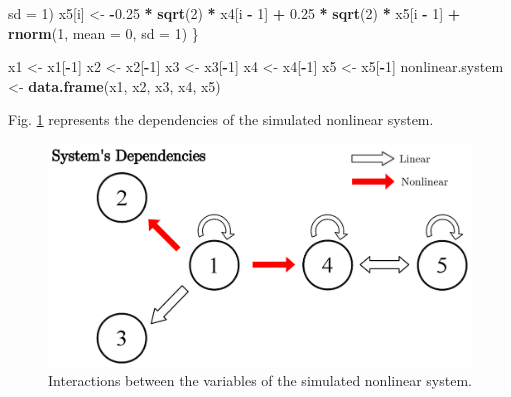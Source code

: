\documentclass[]{book}
\newenvironment{Shaded}{\begin{snugshade}}{\end{snugshade}}
\newcommand{\KeywordTok}[1]{\textcolor[rgb]{0.13,0.29,0.53}{\textbf{#1}}}
\newcommand{\DataTypeTok}[1]{\textcolor[rgb]{0.13,0.29,0.53}{#1}}
\newcommand{\DecValTok}[1]{\textcolor[rgb]{0.00,0.00,0.81}{#1}}
\newcommand{\FloatTok}[1]{\textcolor[rgb]{0.00,0.00,0.81}{#1}}
\newcommand{\StringTok}[1]{\textcolor[rgb]{0.31,0.60,0.02}{#1}}
\newcommand{\OperatorTok}[1]{\textcolor[rgb]{0.81,0.36,0.00}{\textbf{#1}}}
\newcommand{\NormalTok}[1]{#1}
\theoremstyle{definition}
\theoremstyle{definition}
\theoremstyle{definition}
\theoremstyle{remark}
\begin{document}
\begin{Shaded}
\begin{Highlighting}[]
    \DataTypeTok{sd =} \DecValTok{1}\NormalTok{)}
\NormalTok{  x5[i] <-}\StringTok{ }\OperatorTok{-}\FloatTok{0.25} \OperatorTok{*}\StringTok{ }\KeywordTok{sqrt}\NormalTok{(}\DecValTok{2}\NormalTok{) }\OperatorTok{*}\StringTok{ }\NormalTok{x4[i }\OperatorTok{-}\StringTok{ }\DecValTok{1}\NormalTok{] }\OperatorTok{+}\StringTok{ }\FloatTok{0.25} \OperatorTok{*}\StringTok{ }\KeywordTok{sqrt}\NormalTok{(}\DecValTok{2}\NormalTok{) }\OperatorTok{*}\StringTok{ }
\StringTok{    }\NormalTok{x5[i }\OperatorTok{-}\StringTok{ }\DecValTok{1}\NormalTok{] }\OperatorTok{+}\StringTok{ }\KeywordTok{rnorm}\NormalTok{(}\DecValTok{1}\NormalTok{, }\DataTypeTok{mean =} \DecValTok{0}\NormalTok{, }\DataTypeTok{sd =} \DecValTok{1}\NormalTok{)}
\NormalTok{\}}

\NormalTok{x1 <-}\StringTok{ }\NormalTok{x1[}\OperatorTok{-}\DecValTok{1}\NormalTok{]}
\NormalTok{x2 <-}\StringTok{ }\NormalTok{x2[}\OperatorTok{-}\DecValTok{1}\NormalTok{]}
\NormalTok{x3 <-}\StringTok{ }\NormalTok{x3[}\OperatorTok{-}\DecValTok{1}\NormalTok{]}
\NormalTok{x4 <-}\StringTok{ }\NormalTok{x4[}\OperatorTok{-}\DecValTok{1}\NormalTok{]}
\NormalTok{x5 <-}\StringTok{ }\NormalTok{x5[}\OperatorTok{-}\DecValTok{1}\NormalTok{]}
\NormalTok{nonlinear.system <-}\StringTok{ }\KeywordTok{data.frame}\NormalTok{(x1, x2, x3, x4, x5)}
\end{Highlighting}
\end{Shaded}

Fig. \ref{fig:C3S4Fig2} represents the dependencies of the simulated
nonlinear system.

\begin{figure}[H]

{\centering \includegraphics[width=1\linewidth]{./chapters/TransferEntropy/S4Fig2} 

}

\caption{Interactions between the variables of the simulated nonlinear system.}\label{fig:C3S4Fig2}
\end{figure}
\end{document}
